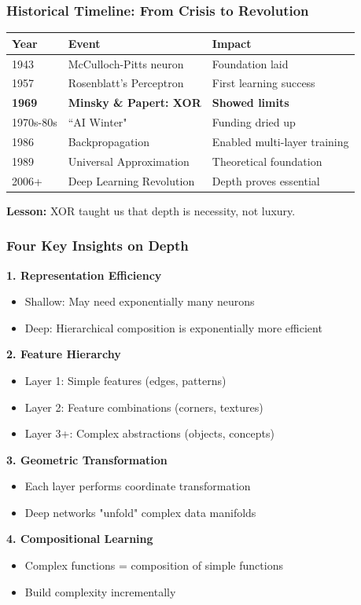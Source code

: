\documentclass[notes]{beamer}
\begin{document}
\begin{frame}
\frametitle{Historical Timeline: From Crisis to Revolution}

\begin{center}
\begin{tabular}{lll}
\toprule
\textbf{Year} & \textbf{Event} & \textbf{Impact} \\
\midrule
1943 & McCulloch-Pitts neuron & Foundation laid \\
1957 & Rosenblatt's Perceptron & First learning success \\
\textbf{1969} & \textbf{Minsky \& Papert: XOR} & \textbf{Showed limits} \\
1970s-80s & ``AI Winter" & Funding dried up \\
1986 & Backpropagation & Enabled multi-layer training \\
1989 & Universal Approximation & Theoretical foundation \\
2006+ & Deep Learning Revolution & Depth proves essential \\
\bottomrule
\end{tabular}
\end{center}

\textbf{Lesson:} XOR taught us that depth is necessity, not luxury.

\end{frame}

\begin{frame}
\frametitle{Four Key Insights on Depth}

\textbf{1. Representation Efficiency}
\begin{itemize}
\item Shallow: May need exponentially many neurons
\item Deep: Hierarchical composition is exponentially more efficient
\end{itemize}

\textbf{2. Feature Hierarchy}
\begin{itemize}
\item Layer 1: Simple features (edges, patterns)
\item Layer 2: Feature combinations (corners, textures)
\item Layer 3+: Complex abstractions (objects, concepts)
\end{itemize}

\textbf{3. Geometric Transformation}
\begin{itemize}
\item Each layer performs coordinate transformation
\item Deep networks "unfold" complex data manifolds
\end{itemize}

\textbf{4. Compositional Learning}
\begin{itemize}
\item Complex functions = composition of simple functions
\item Build complexity incrementally
\end{itemize}

\end{frame}
\end{document}

